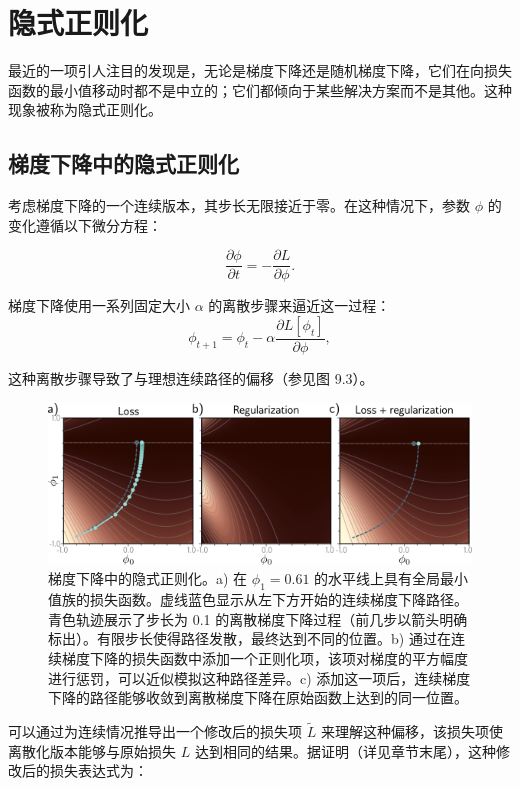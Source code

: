 \section{隐式正则化}

最近的一项引人注目的发现是，无论是梯度下降还是随机梯度下降，它们在向损失函数的最小值移动时都不是中立的；它们都倾向于某些解决方案而不是其他。这种现象被称为隐式正则化。
\subsection{梯度下降中的隐式正则化}

考虑梯度下降的一个连续版本，其步长无限接近于零。在这种情况下，参数 \(\phi\) 的变化遵循以下微分方程：

\begin{equation}
\frac{\partial \phi}{\partial t} = -\frac{\partial L}{\partial \phi}. 
\end{equation}

梯度下降使用一系列固定大小 \(\alpha\) 的离散步骤来逼近这一过程：
\begin{equation}
\phi_{t+1} = \phi_t - \alpha \frac{\partial L[\phi_t]}{\partial \phi} , 
\end{equation}

这种离散步骤导致了与理想连续路径的偏移（参见图 9.3）。

\begin{figure}[ht!]
	\centering
	\includegraphics[width=0.7\linewidth]{png/chapter9/RegImplicit1.png}
	\caption{梯度下降中的隐式正则化。a) 在 \(\phi_1 = 0.61\) 的水平线上具有全局最小值族的损失函数。虚线蓝色显示从左下方开始的连续梯度下降路径。青色轨迹展示了步长为 0.1 的离散梯度下降过程（前几步以箭头明确标出）。有限步长使得路径发散，最终达到不同的位置。b) 通过在连续梯度下降的损失函数中添加一个正则化项，该项对梯度的平方幅度进行惩罚，可以近似模拟这种路径差异。c) 添加这一项后，连续梯度下降的路径能够收敛到离散梯度下降在原始函数上达到的同一位置。}
\end{figure}


可以通过为连续情况推导出一个修改后的损失项 \(\tilde{L}\) 来理解这种偏移，该损失项使离散化版本能够与原始损失 \(L\) 达到相同的结果。据证明（详见章节末尾），这种修改后的损失表达式为：

